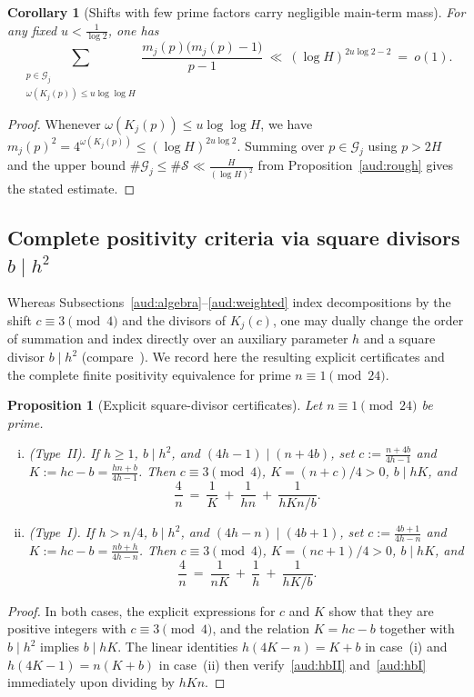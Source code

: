 \documentclass[11pt, a4paper]{article}
\theoremstyle{plain}
\newtheorem{corollary}[theorem]{Corollary}
\newtheorem{proposition}[theorem]{Proposition}
\theoremstyle{definition}
\begin{document}
\begin{corollary}[Shifts with few prime factors carry negligible main-term mass]\label{aud:lowomega}
For any fixed $u<\frac{1}{\log 2}$, one has
\[
\sum_{\substack{p\in\mathcal{G}_j\\ \omega(K_j(p))\le u\log\log H}}\frac{m_j(p)\big(m_j(p)-1\big)}{p-1}\ \ll\ (\log H)^{2u\log 2-2}\ =\ o(1).
\]
\end{corollary}
\begin{proof}
Whenever $\omega(K_j(p))\le u\log\log H$, we have $m_j(p)^{2}=4^{\omega(K_j(p))}\le(\log H)^{2u\log 2}$. Summing over $p\in\mathcal{G}_j$ using $p>2H$ and the upper bound $\#\mathcal{G}_j\le\#\mathcal{S}\ll\frac{H}{(\log H)^{2}}$ from Proposition~\ref{aud:rough} gives the stated estimate.
\end{proof}

\subsection{Complete positivity criteria via square divisors $b\mid h^{2}$}\label{aud:hb}

Whereas Subsections~\ref{aud:algebra}--\ref{aud:weighted} index decompositions by the shift $c\equiv 3\pmod 4$ and the divisors of $K_j(c)$, one may dually change the order of summation and index directly over an auxiliary parameter $h$ and a square divisor $b\mid h^{2}$ (compare~\cite[\S2]{elsholtz2013}). We record here the resulting explicit certificates and the complete finite positivity equivalence for prime $n\equiv 1\pmod{24}$.

\begin{proposition}[Explicit square-divisor certificates]\label{aud:hbcert}
Let $n\equiv 1\pmod{24}$ be prime.
\begin{enumerate}[(i)]
    \item \emph{(Type~II).} If $h\ge1$, $b\mid h^{2}$, and $(4h-1)\mid(n+4b)$, set $c:=\frac{n+4b}{4h-1}$ and $K:=hc-b=\frac{hn+b}{4h-1}$. Then $c\equiv3\pmod 4$, $K=(n+c)/4>0$, $b\mid hK$, and
    \begin{equation}\label{aud:hbII}
    \frac{4}{n}\ =\ \frac{1}{K}\ +\ \frac{1}{hn}\ +\ \frac{1}{hKn/b}.
    \end{equation}
    \item \emph{(Type~I).} If $h>n/4$, $b\mid h^{2}$, and $(4h-n)\mid(4b+1)$, set $c:=\frac{4b+1}{4h-n}$ and $K:=hc-b=\frac{nb+h}{4h-n}$. Then $c\equiv3\pmod 4$, $K=(nc+1)/4>0$, $b\mid hK$, and
    \begin{equation}\label{aud:hbI}
    \frac{4}{n}\ =\ \frac{1}{nK}\ +\ \frac{1}{h}\ +\ \frac{1}{hK/b}.
    \end{equation}
\end{enumerate}
\end{proposition}
\begin{proof}
In both cases, the explicit expressions for $c$ and $K$ show that they are positive integers with $c\equiv 3\pmod 4$, and the relation $K=hc-b$ together with $b\mid h^{2}$ implies $b\mid hK$. The linear identities $h(4K-n)=K+b$ in case~(i) and $h(4K-1)=n(K+b)$ in case~(ii) then verify~\eqref{aud:hbII} and~\eqref{aud:hbI} immediately upon dividing by $hKn$.
\end{proof}
\end{document}
